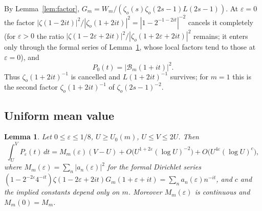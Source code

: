 \documentclass[11pt]{amsart}
\newtheorem{lemma}{Lemma}
\theoremstyle{remark}
\newcommand{\zo}{\zeta_{o}}
\newcommand{\cB}{\mathcal{B}}
\begin{document}
By Lemma~\ref{lem:factor}, $G_m=W_m/(\zo(s)\zo(2s-1)L(2s-1))$. At $\varepsilon=0$ the factor $|\zeta(1-2it)|^2/|\zo(1+2it)|^2=|1-2^{-1-2it}|^{-2}$ cancels it completely (for $\varepsilon>0$ the ratio $|\zeta(1-2\varepsilon+2it)|^2/|\zo(1+2\varepsilon+2it)|^2$ remains; it enters only through the formal series of Lemma~\ref{lem:mv}, whose local factors tend to those at $\varepsilon=0$), and
\[
P_0(t)=|\cB_m(1+it)|^2.
\]
Thus $\zo(1+2it)^{-1}$ is cancelled and $L(1+2it)^{-1}$ survives; for $m=1$ this is the second factor $\zo(1+2it)^{-1}$ of $\zo(2s-1)^{-2}$.

\subsection{Uniform mean value}

\begin{lemma}\label{lem:mv}
Let $0\le\varepsilon\le1/8$, $U\ge U_0(m)$, $U\le V\le2U$. Then
\[
\int_U^VP_\varepsilon(t)\,dt=M_m(\varepsilon)(V-U)+O\big(U^{1+2\varepsilon}(\log U)^{-2}\big)+O\big(U^{4\varepsilon}(\log U)^{c}\big),
\]
where $M_m(\varepsilon)=\sum_n|a_n(\varepsilon)|^2$ for the formal Dirichlet series $(1-2^{-2\varepsilon}4^{-it})\zeta(1-2\varepsilon+2it)G_m(1+\varepsilon+it)=\sum_na_n(\varepsilon)n^{-it}$, and $c$ and the implied constants depend only on $m$. Moreover $M_m(\varepsilon)$ is continuous and $M_m(0)=M_m$.
\end{lemma}
\end{document}
